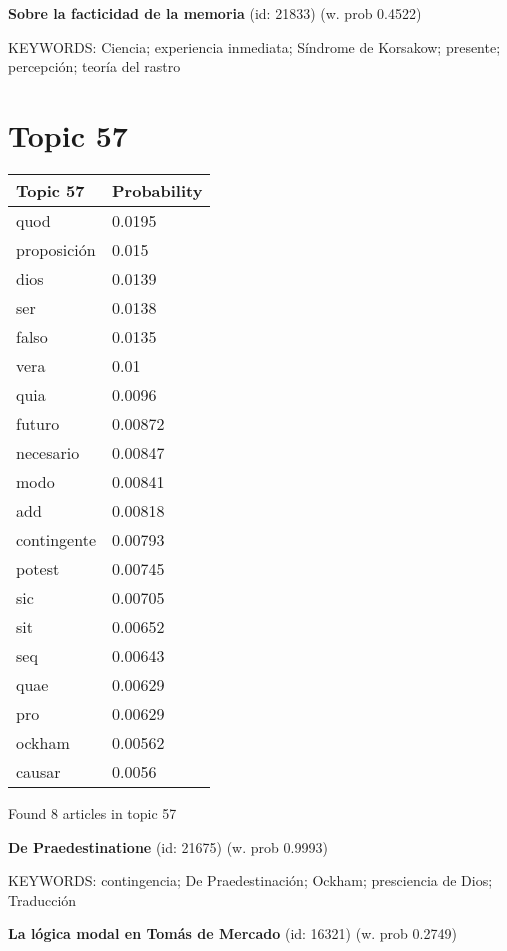 \documentclass{article}
\begin{document}
\textbf{Sobre la facticidad de la memoria} (id: 21833)
 (w. prob 0.4522)


KEYWORDS:
Ciencia; experiencia inmediata; Síndrome de Korsakow; presente; percepción; teoría del rastro

\vfill
\newpage


\centering
\thispagestyle{empty}
\section*{Topic 57}\vfill
\begin{tabular}{ll}
\toprule
    Topic 57 & Probability \\
\midrule
        quod &      0.0195 \\
 proposición &       0.015 \\
        dios &      0.0139 \\
         ser &      0.0138 \\
       falso &      0.0135 \\
        vera &        0.01 \\
        quia &      0.0096 \\
      futuro &     0.00872 \\
   necesario &     0.00847 \\
        modo &     0.00841 \\
         add &     0.00818 \\
 contingente &     0.00793 \\
      potest &     0.00745 \\
         sic &     0.00705 \\
         sit &     0.00652 \\
         seq &     0.00643 \\
        quae &     0.00629 \\
         pro &     0.00629 \\
      ockham &     0.00562 \\
      causar &      0.0056 \\
\bottomrule
\end{tabular}

\vfill
Found 8 articles in topic 57
\vfill

\textbf{De Praedestinatione} (id: 21675)
 (w. prob 0.9993)


KEYWORDS:
contingencia; De Praedestinación; Ockham; presciencia de Dios; Traducción
\vfill

\textbf{La lógica modal en Tomás de Mercado} (id: 16321)
 (w. prob 0.2749)
\end{document}
